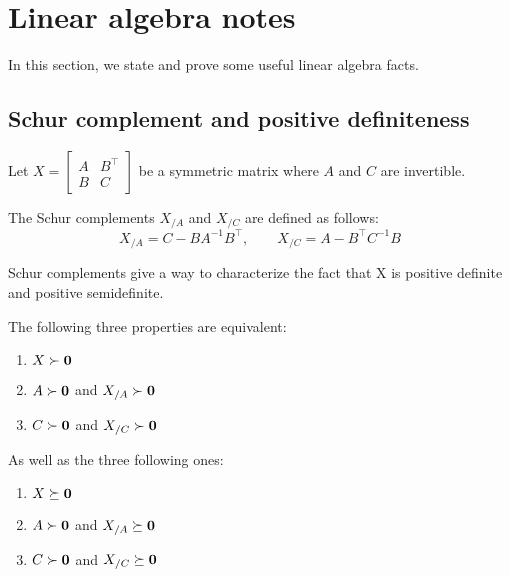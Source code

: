 \chapter{Linear algebra notes}\label{ch:linear_algebra}

In this section, we state and prove some useful linear algebra facts.

\section{Schur complement and positive definiteness}\label{sec:schur_complement}

Let $X = \begin{bmatrix}
             A & B^\top\\
             B & C
\end{bmatrix}$
be a symmetric matrix where $A$ and $C$ are invertible.
\begin{definition}
    The Schur complements $X_{/A}$ and $X_{/C}$ are defined as follows:
    \begin{equation*}
        X_{/A} = C - B A^{-1} B^\top
        ,\qquad
        X_{/C} = A - B^\top C^{-1} B
    \end{equation*}
\end{definition}
Schur complements give a way to characterize the fact that X is positive definite and positive semidefinite.
\begin{lemma}\label{lemma:schur_complement_psd}
The following three properties are equivalent:
\begin{enumerate}
    \item $X \succ \mathbf{0}$
    \item $A \succ \mathbf{0}$ and $X_{/A} \succ \mathbf{0}$
    \item $C \succ \mathbf{0}$ and $X_{/C} \succ \mathbf{0}$
\end{enumerate}
As well as the three following ones:
\begin{enumerate}
    \item $X \succeq \mathbf{0}$
    \item $A \succ \mathbf{0}$ and $X_{/A} \succeq \mathbf{0}$
    \item $C \succ \mathbf{0}$ and $X_{/C} \succeq \mathbf{0}$
\end{enumerate}
\end{lemma}
